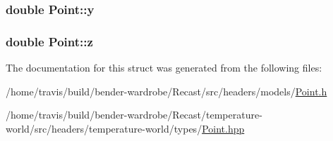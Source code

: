 \hypertarget{struct_point_afa38be143ae800e6ad69ce8ed4df62d8}{
\subsubsection[{y}]{\setlength{\rightskip}{0pt plus 5cm}double Point\-::y}}\label{struct_point_afa38be143ae800e6ad69ce8ed4df62d8}
\hypertarget{struct_point_a05ba3b1dfcb19430582ae953cbbfbded}{
\subsubsection[{z}]{\setlength{\rightskip}{0pt plus 5cm}double Point\-::z}}\label{struct_point_a05ba3b1dfcb19430582ae953cbbfbded}


The documentation for this struct was generated from the following files\-:\begin{DoxyCompactItemize}
\item 
/home/travis/build/bender-\/wardrobe/\-Recast/src/headers/models/\hyperlink{_point_8h}{Point.\-h}\item 
/home/travis/build/bender-\/wardrobe/\-Recast/temperature-\/world/src/headers/temperature-\/world/types/\hyperlink{_point_8hpp}{Point.\-hpp}\end{DoxyCompactItemize}
